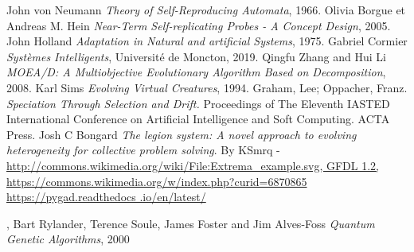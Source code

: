 \documentclass[journal, a4paper]{IEEEtran}
\begin{document}
%
%
%
%
\begin{thebibliography}{99}
	 John von Neumann
	\textit{Theory of Self-Reproducing Automata}, 1966.
	 Olivia Borgue et Andreas M.
	Hein \textit{Near-Term Self-replicating Probes - A Concept Design}, 2005.
	 John Holland \textit{Adaptation in
	Natural
	and artificial Systems}, 1975.
	 Gabriel Cormier \textit{Systèmes Intelligents}, Université de Moncton, 2019.
	 Qingfu Zhang and Hui Li \textit{MOEA/D: A Multiobjective Evolutionary Algorithm Based on Decomposition}, 2008.
	 Karl Sims \textit{Evolving Virtual Creatures}, 1994.
	 Graham, Lee; Oppacher, Franz. \textit{
	Speciation Through Selection and Drift. } Proceedings of The Eleventh IASTED International Conference on Artificial Intelligence and Soft Computing. ACTA Press.
	 Josh C Bongard \textit{The legion
	system: A novel approach to evolving heterogeneity for collective problem solving}.
	 By KSmrq -  \url{http://commons.wikimedia.org/wiki/File:Extrema_example.svg, GFDL 1.2, https://commons.wikimedia.org/w/index.php?curid=6870865}
	 \url{https://pygad.readthedocs
	.io/en/latest/}

	 , Bart Rylander, Terence Soule,
	James Foster and Jim Alves-Foss \textit{Quantum Genetic Algorithms}, 2000
\end{thebibliography}

%
%



\end{document}
